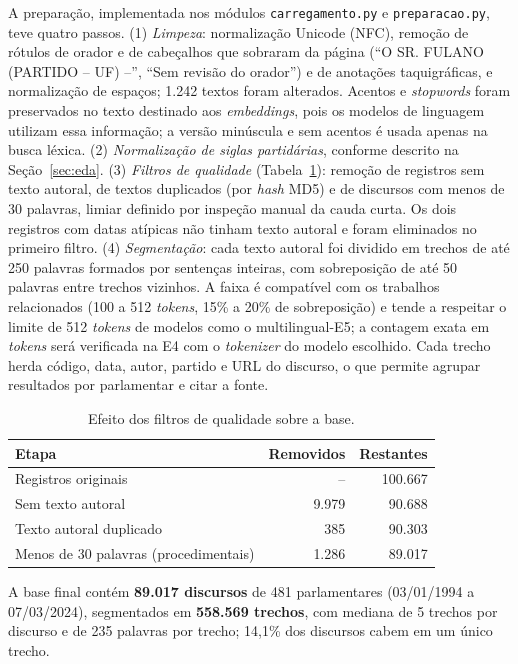 \documentclass[12pt]{article}
\begin{document}
A preparação, implementada nos módulos \texttt{carregamento.py} e \texttt{preparacao.py}, teve
quatro passos.
(1) \emph{Limpeza}: normalização Unicode (NFC), remoção de rótulos de orador e de cabeçalhos que
sobraram da página (``O SR. FULANO (PARTIDO -- UF) --'', ``Sem revisão do orador'') e de
anotações taquigráficas, e normalização de espaços; 1.242 textos foram alterados. Acentos e
\textit{stopwords} foram preservados no texto destinado aos \textit{embeddings}, pois os modelos
de linguagem utilizam essa informação; a versão minúscula e sem acentos é usada apenas na busca
léxica.
(2) \emph{Normalização de siglas partidárias}, conforme descrito na Seção~\ref{sec:eda}.
(3) \emph{Filtros de qualidade} (Tabela~\ref{tab:filtros}): remoção de registros sem texto
autoral, de textos duplicados (por \textit{hash} MD5) e de discursos com menos de 30 palavras,
limiar definido por inspeção manual da cauda curta. Os dois registros com datas atípicas não
tinham texto autoral e foram eliminados no primeiro filtro.
(4) \emph{Segmentação}: cada texto autoral foi dividido em trechos de até 250 palavras formados
por sentenças inteiras, com sobreposição de até 50 palavras entre trechos vizinhos. A faixa é
compatível com os trabalhos relacionados (100 a 512 \textit{tokens}, 15\% a 20\% de sobreposição)
e tende a respeitar o limite de 512 \textit{tokens} de modelos como o multilingual-E5; a contagem
exata em \textit{tokens} será verificada na E4 com o \textit{tokenizer} do modelo escolhido. Cada
trecho herda código, data, autor, partido e URL do discurso, o que permite agrupar resultados por
parlamentar e citar a fonte.

\begin{table}[ht]
\centering
\caption{Efeito dos filtros de qualidade sobre a base.}
\label{tab:filtros}
\footnotesize
\begin{tabular}{@{}lrr@{}}
\toprule
\textbf{Etapa} & \textbf{Removidos} & \textbf{Restantes} \\
\midrule
Registros originais                        & --    & 100.667 \\
Sem texto autoral                          & 9.979 & 90.688 \\
Texto autoral duplicado                    & 385   & 90.303 \\
Menos de 30 palavras (procedimentais)      & 1.286 & 89.017 \\
\bottomrule
\end{tabular}
\end{table}

A base final contém \textbf{89.017 discursos} de 481 parlamentares (03/01/1994 a 07/03/2024),
segmentados em \textbf{558.569 trechos}, com mediana de 5 trechos por discurso e de 235 palavras
por trecho; 14,1\% dos discursos cabem em um único trecho.
\end{document}
